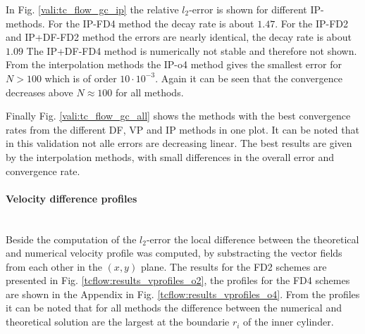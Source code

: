 In Fig. \ref{vali:tc_flow_gc_ip} the relative $l_2$-error is shown for different IP-methods.
For the IP-FD4 method the decay rate is about $1.47$.
For the IP-FD2 and IP+DF-FD2 method the errors are nearly  identical, the decay rate is about $1.09$
The IP+DF-FD4 method is numerically not stable and therefore not shown.
From the interpolation methods the IP-o4 method gives the smallest error for $N>100$ which is of order $10 \cdot 10^{-3}$.
Again it can be seen that the convergence decreases above $N\approx100$ for all methods.


Finally Fig. \ref{vali:tc_flow_gc_all} shows the methods with the best convergence
rates from the different DF, VP and IP methods in one plot.
It can be noted that in this validation not alle errors are decreasing linear.
The best results are given by the interpolation methods, with small differences in the overall error
and convergence rate.

\paragraph{Velocity difference profiles}\mbox{}\\

Beside the computation of the $l_2$-error the local difference between the theoretical and numerical velocity
profile was computed, by substracting the vector fields from each other in the $(x, y)$ plane.
The results for the FD2 schemes are presented in Fig. \ref{tcflow:results_vprofiles_o2}, the profiles
for the FD4 schemes are shown in the Appendix in Fig. \ref{tcflow:results_vprofiles_o4}.
From the profiles it can be noted that for all methods the difference between the numerical and
theoretical solution are the largest at the boundarie $r_i$ of the  inner cylinder.

